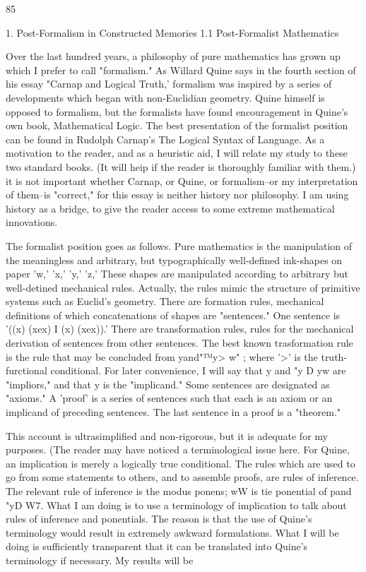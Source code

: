 \documentclass[10pt,twoside]{memoir}
\begin{document}
\begin{enumerate}
{{{{{{{{{{{{{{{{85 


1. Post-Formalism in Constructed Memories 
1.1 Post-Formalist Mathematics 

Over the last hundred years, a philosophy of pure mathematics has 
grown up which I prefer to call "formalism." As Willard Quine says in the 
fourth section of his essay "Carnap and Logical Truth,' formalism was 
inspired by a series of developments which began with non-Euclidian 
geometry. Quine himself is opposed to formalism, but the formalists have 
found encouragement in Quine's own book, Mathematical Logic. The best 
presentation of the formalist position can be found in Rudolph Carnap's The 
Logical Syntax of Language. As a motivation to the reader, and 
as a heuristic aid, I will relate my study to these two standard books. (It will 
heip if the reader is thoroughly familiar with them.) it is not important 
whether Carnap, or Quine, or formalism--or my interpretation of them--is 
"correct," for this essay is neither history nor philosophy. I am using history 
as a bridge, to give the reader access to some extreme mathematical 
innovations. 

The formalist position goes as follows. Pure mathematics is the 
manipulation of the meaningless and arbitrary, but typographically 
well-defined ink-shapes on paper 'w,' 'x,' 'y,' 'z,' %
These shapes are manipulated according to arbitrary but well-detined 
mechanical rules. Actually, the rules mimic the structure of primitive 
systems such as Euclid's geometry. There are formation rules, mechanical 
definitions of which concatenations of shapes are "sentences." One sentence 
is '{((x) (xex}) I (x) (xex)).' There are transformation rules, rules for the 
mechanical derivation of sentences from other sentences. The best known 
trasformation rule is the rule that may be concluded from yand"™y> w" ; 
where '>' is the truth-furctional conditional. For later convenience, I will 
say that y and "y D yw are "impliors," and that y is the "implicand." 
Some sentences are designated as "axioms." A 'proof' is a series of 
sentences such that each is an axiom or an implicand of preceding sentences. 
The last sentence in a proof is a "theorem." 

This account is ultrasimplified and non-rigorous, but it is adequate for 
my purposes. (The reader may have noticed a terminological issue here. For 
Quine, an implication is merely a logically true conditional. The rules which 
are used to go from some statements to others, and to assemble proofs, are 
rules of inference. The relevant rule of inference is the modus ponens; wW is 
tie ponential of pand "yD W7. What I am doing is to use a terminology of 
implication to talk about rules of inference and ponentials. The reason is 
that the use of Quine's terminology would result in extremely awkward 
formulations. What I will be doing is sufficiently transparent that it can be 
translated into Quine's terminology if necessary. My results will be 


}}}}}}}}}}}}}}}}
\end{enumerate}
\end{document}
